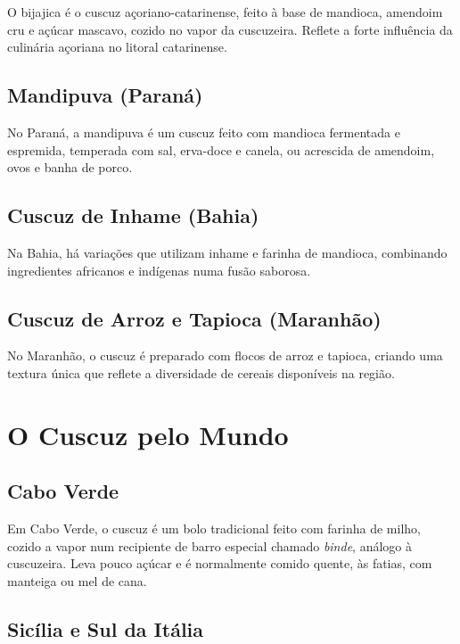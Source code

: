 \documentclass[12pt,a4paper,openright]{book}
\begin{document}
O bijajica é o cuscuz açoriano-catarinense, feito à base de mandioca, amendoim cru e açúcar mascavo, cozido no vapor da cuscuzeira. Reflete a forte influência da culinária açoriana no litoral catarinense.

\section{Mandipuva (Paraná)}

No Paraná, a mandipuva é um cuscuz feito com mandioca fermentada e espremida, temperada com sal, erva-doce e canela, ou acrescida de amendoim, ovos e banha de porco.

\section{Cuscuz de Inhame (Bahia)}

Na Bahia, há variações que utilizam inhame e farinha de mandioca, combinando ingredientes africanos e indígenas numa fusão saborosa.

\section{Cuscuz de Arroz e Tapioca (Maranhão)}

No Maranhão, o cuscuz é preparado com flocos de arroz e tapioca, criando uma textura única que reflete a diversidade de cereais disponíveis na região.

\chapter{O Cuscuz pelo Mundo}

\section{Cabo Verde}

Em Cabo Verde, o cuscuz é um bolo tradicional feito com farinha de milho, cozido a vapor num recipiente de barro especial chamado \textit{binde}, análogo à cuscuzeira. Leva pouco açúcar e é normalmente comido quente, às fatias, com manteiga ou mel de cana.

\section{Sicília e Sul da Itália}
\end{document}
